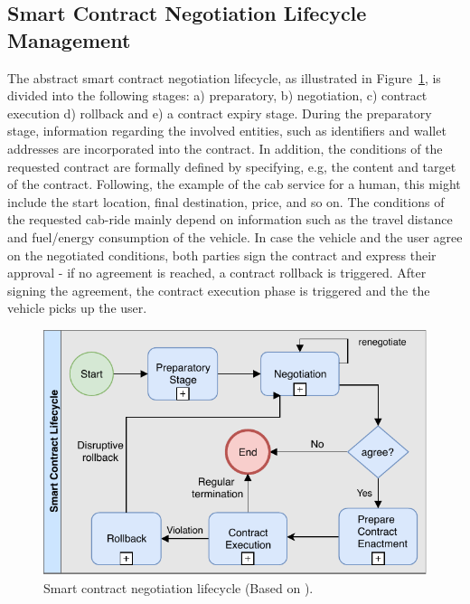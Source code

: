 \documentclass{llncs}
\begin{document}
{		%
		
		\subsection{Smart Contract Negotiation Lifecycle Management}
			\label{ss:smart-contract-lifecycle-management}
			
			The abstract smart contract negotiation lifecycle, as illustrated in Figure~\ref{fig:smart-contract-lifecycle-management}, is divided into the following stages: a) preparatory, b) negotiation, c) contract execution d) rollback and e) a contract expiry stage. During the preparatory stage, information regarding the involved entities, such as identifiers and wallet addresses are incorporated into the contract. In addition, the conditions of the requested contract are formally defined by specifying, e.g, the content and target of the contract. Following, the example of the cab service for a human, this might include the start location, final destination, price, and so on. The conditions of the requested cab-ride mainly depend on information such as the travel distance and fuel/energy consumption of the vehicle. In case the vehicle and the user agree on the negotiated conditions, both parties sign the contract and express their approval - if no agreement is reached, a contract rollback is triggered. After signing the agreement, the contract execution phase is triggered and the the vehicle picks up the user. 

			\begin{figure}[H]
				\centering
				\includegraphics[scale=0.65]{Figures/smart-contract-lifecycle/20180504_smart-contract-lilfefycle.pdf}
				\caption{Smart contract negotiation lifecycle (Based on \cite{qtumWhitepaper}).}	
				\label{fig:smart-contract-lifecycle-management}
			\end{figure}			

}
\end{document}

